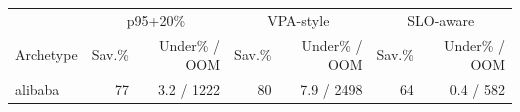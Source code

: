 \begin{tabular}{lrrrrrr}\toprule
 & \multicolumn{2}{c}{p95+20\%} & \multicolumn{2}{c}{VPA-style} & \multicolumn{2}{c}{SLO-aware} \\
Archetype & Sav.\% & Under\% / OOM & Sav.\% & Under\% / OOM & Sav.\% & Under\% / OOM \\\midrule
alibaba & 77 & 3.2 / 1222 & 80 & 7.9 / 2498 & 64 & 0.4 / 582 \\
\bottomrule\end{tabular}
